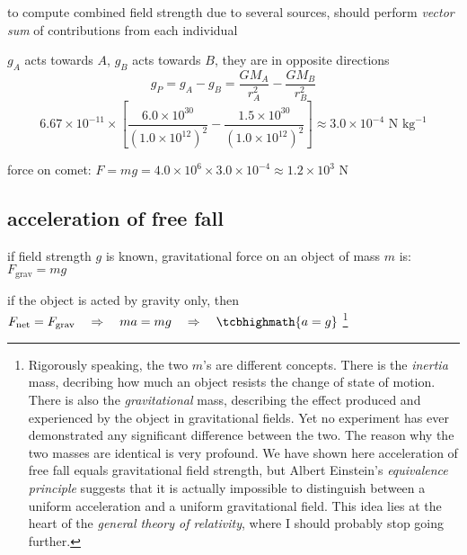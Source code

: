 to compute combined field strength due to several sources, should perform \emph{vector sum} of contributions from each individual



\begin{center}
\end{center}

\begin{soln}
     $g_A$ acts towards $A$, $g_B$ acts towards $B$, they are in opposite directions
\begin{equation*}
	g_P = g_A - g_B = \frac{GM_A}{r_A^2} - \frac{GM_B}{r_B^2}\end{equation*} \begin{equation*}
	     6.67\times10^{-11} \times\left[ \frac{6.0\times10^{30}}{(1.0\times10^{12})^2} - \frac{1.5\times10^{30}}{(1.0\times10^{12})^2}\right] \approx 3.0\times10^{-4} \text{ N kg}^{-1}
\end{equation*}

force on comet: $F=mg = 4.0\times10^6 \times 3.0\times10^{-4} \approx 1.2\times10^3 \text{ N}$ \end{soln}

\subsection{acceleration of free fall}

if field strength $g$ is known, gravitational force on an object of mass $m$ is: $F_\text{grav} = mg$

if the object is acted by gravity only, then $\fnet = F_\text{grav} \RA ma = mg \RA \tcbhighmath{a=g}$
\footnote[][-4cm]{Rigorously speaking, the two $m$'s are different concepts. There is the \emph{inertia} mass, decribing how much an object resists the change of state of motion. There is also the \emph{gravitational} mass, describing the effect produced and experienced by the object in gravitational fields. Yet no experiment has ever demonstrated any significant difference between the two. The reason why the two masses are identical is very profound. We have shown here acceleration of free fall equals gravitational field strength, but Albert Einstein's \emph{equivalence principle} suggests that it is actually impossible to distinguish between a uniform acceleration and a uniform gravitational field. This idea lies at the heart of the \emph{general theory of relativity}, where I should probably stop going further.}

